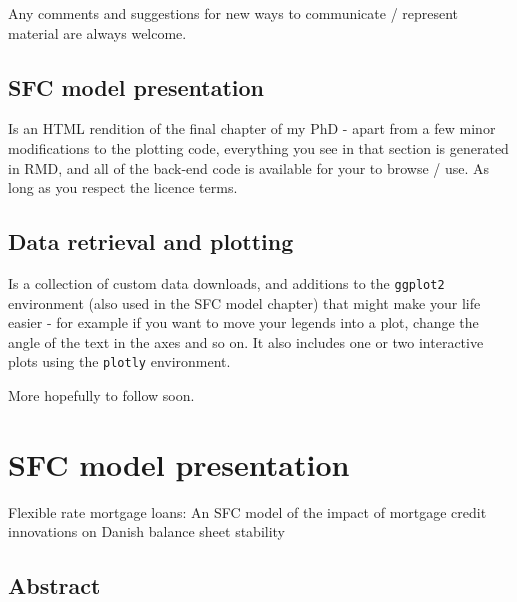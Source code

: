 \documentclass[
]{book}
\begin{document}
Any comments and suggestions for new ways to communicate / represent material are always welcome.

\hypertarget{sfc-model-presentation}{%
\section{SFC model presentation}\label{sfc-model-presentation}}

Is an HTML rendition of the final chapter of my PhD - apart from a few minor modifications to the plotting code, everything you see in that section is generated in RMD, and all of the back-end code is available for your to browse / use. As long as you respect the licence terms.

\hypertarget{data-retrieval-and-plotting}{%
\section{Data retrieval and plotting}\label{data-retrieval-and-plotting}}

Is a collection of custom data downloads, and additions to the \texttt{ggplot2} environment (also used in the SFC model chapter) that might make your life easier - for example if you want to move your legends into a plot, change the angle of the text in the axes and so on. It also includes one or two interactive plots using the \texttt{plotly} environment.

More hopefully to follow soon.

\hypertarget{sfc-model-presentation-1}{%
\chapter{SFC model presentation}\label{sfc-model-presentation-1}}

Flexible rate mortgage loans: An SFC model of the impact of mortgage credit innovations on Danish balance sheet stability

\hypertarget{abstract}{%
\section*{Abstract}\label{abstract}}
\end{document}
